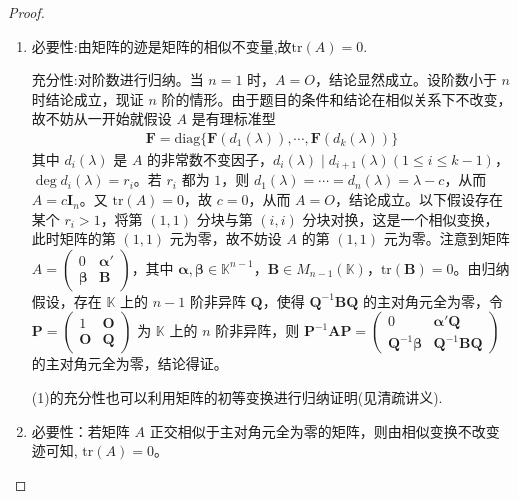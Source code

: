 \documentclass[../../main.tex]{subfiles}
\begin{document}
\begin{proof}
\begin{enumerate}[(1)]
\item 必要性:由矩阵的迹是矩阵的相似不变量,故$\mathrm{tr}(A)=0$.

充分性:对阶数进行归纳。当 $n = 1$ 时，$A = O$，结论显然成立。设阶数小于 $n$ 时结论成立，现证 $n$ 阶的情形。由于题目的条件和结论在相似关系下不改变，故不妨从一开始就假设 $A$ 是有理标准型
\begin{align*}
\boldsymbol{F}=\mathrm{diag}\{\boldsymbol{F}(d_1(\lambda)),\cdots,\boldsymbol{F}(d_k(\lambda))\}
\end{align*}
其中 $d_i(\lambda)$ 是 $A$ 的非常数不变因子，$d_i(\lambda)\mid d_{i + 1}(\lambda) (1\leq i\leq k - 1)$，$\deg d_i(\lambda)=r_i$。若 $r_i$ 都为 $1$，则 $d_1(\lambda)=\cdots = d_n(\lambda)=\lambda - c$，从而 $A = c\boldsymbol{I}_n$。又 $\mathrm{tr}(A)=0$，故 $c = 0$，从而 $A = O$，结论成立。以下假设存在某个 $r_i>1$，将第 $(1,1)$ 分块与第 $(i,i)$ 分块对换，这是一个相似变换，此时矩阵的第 $(1,1)$ 元为零，故不妨设 $A$ 的第 $(1,1)$ 元为零。注意到矩阵 $A=\begin{pmatrix}
0 & \boldsymbol{\alpha}' \\
\boldsymbol{\beta} & \boldsymbol{B}
\end{pmatrix}$，其中 $\boldsymbol{\alpha},\boldsymbol{\beta}\in\mathbb{K}^{n - 1}$，$\boldsymbol{B}\in M_{n - 1}(\mathbb{K})$，$\mathrm{tr}(\boldsymbol{B})=0$。由归纳假设，存在 $\mathbb{K}$ 上的 $n - 1$ 阶非异阵 $\boldsymbol{Q}$，使得 $\boldsymbol{Q}^{-1}\boldsymbol{B}\boldsymbol{Q}$ 的主对角元全为零，令 $\boldsymbol{P}=\begin{pmatrix}
1 & \boldsymbol{O} \\
\boldsymbol{O} & \boldsymbol{Q}
\end{pmatrix}$ 为 $\mathbb{K}$ 上的 $n$ 阶非异阵，则 $\boldsymbol{P}^{-1}\boldsymbol{A}\boldsymbol{P}=\begin{pmatrix}
0 & \boldsymbol{\alpha}'\boldsymbol{Q} \\
\boldsymbol{Q}^{-1}\boldsymbol{\beta} & \boldsymbol{Q}^{-1}\boldsymbol{B}\boldsymbol{Q}
\end{pmatrix}$ 的主对角元全为零，结论得证。

\begin{remark}
(1)的充分性也可以利用矩阵的初等变换进行归纳证明(见清疏讲义).
\end{remark}

\item 必要性：若矩阵 \( A \) 正交相似于主对角元全为零的矩阵，则由相似变换不改变迹可知, \(\mathrm{tr}(A) = 0\)。


\end{enumerate}
\end{proof}
\end{document}
